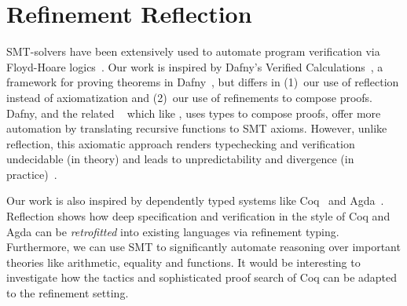 \section{Refinement Reflection}\label{sec:refinementreflection:related}


%
SMT-solvers have been extensively used to automate
program verification via Floyd-Hoare logics~\cite{Nelson81}.
%
Our work is inspired by Dafny's Verified
Calculations~\citep{LeinoPolikarpova16},
a framework for proving theorems in
Dafny~\citep{dafny}, but differs in
%
(1)~our use of reflection instead of axiomatization and
(2)~our use of refinements to compose proofs.
%
Dafny, and the related \fstar~\citep{fstar}
which like \toolname, uses types to compose
proofs, offer more automation by translating
recursive functions to SMT axioms.
However, unlike reflection, this axiomatic
approach renders typechecking and verification
undecidable (in theory) and leads to
unpredictability and divergence
(in practice)~\citep{Leino16}.




%
Our work is also inspired by dependently typed
systems like Coq~\citep{coq-book} and
Agda~\citep{agda}.
%
Reflection shows how deep specification
and verification in the style of Coq and Agda
can be \emph{retrofitted} into existing languages
via refinement typing.
%
Furthermore, we can use SMT to significantly
automate reasoning over important theories like
arithmetic, equality and functions.
%
It would be interesting to investigate how
the tactics and sophisticated proof search
of Coq \etc can be adapted to the refinement setting.

